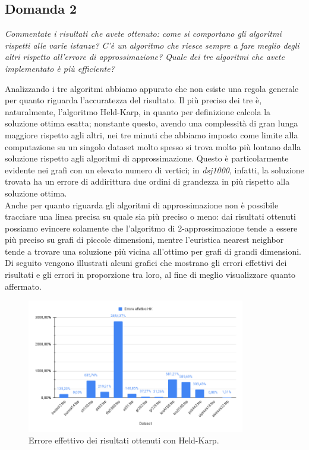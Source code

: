 \subsection{Domanda 2}
\textit{Commentate i risultati che avete ottenuto: come si comportano gli algoritmi rispetti alle varie istanze?
C'è un algoritmo che riesce sempre a fare meglio degli altri rispetto all'errore di approssimazione? Quale dei tre
algoritmi che avete implementato è più efficiente?}

Analizzando i tre algoritmi abbiamo appurato che non esiste una regola generale per quanto riguarda l'accuratezza del risultato. Il più preciso dei tre è, naturalmente, l'algoritmo Held-Karp, in quanto per definizione calcola la soluzione ottima esatta; nonstante questo, avendo una complessità di gran lunga maggiore rispetto agli altri, nei tre minuti che abbiamo imposto come limite alla computazione su un singolo dataset molto spesso si trova molto più lontano dalla soluzione rispetto agli algoritmi di approssimazione. Questo è particolarmente evidente nei grafi con un elevato numero di vertici; in \textit{dsj1000}, infatti, la soluzione trovata ha un errore di addirittura due ordini di grandezza in più rispetto alla soluzione ottima. \\
Anche per quanto riguarda gli algoritmi di approssimazione non è possibile tracciare una linea precisa su quale sia più preciso o meno: dai risultati ottenuti possiamo evincere solamente che l'algoritmo di 2-approssimazione tende a essere più preciso su grafi di piccole dimensioni, mentre l'euristica nearest neighbor tende a trovare una soluzione più vicina all'ottimo per grafi di grandi dimensioni. \\
Di seguito vengono illustrati alcuni grafici che mostrano gli errori effettivi dei risultati e gli errori in proporzione tra loro, al fine di meglio visualizzare quanto affermato.

\begin{figure}[H]
	\centering
	\includegraphics[width=0.85\textwidth]{res/images/errors/hk-effettivo.png}
	\caption{Errore effettivo dei risultati ottenuti con Held-Karp.}
	\label{fig:errors-hk-effettivo}
\end{figure}

